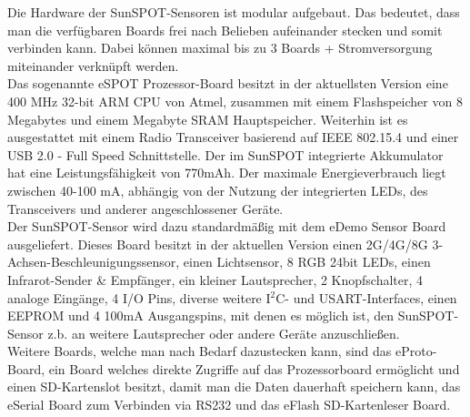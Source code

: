 Die Hardware der SunSPOT-Sensoren ist modular aufgebaut. Das bedeutet, dass man die verfügbaren Boards frei nach Belieben aufeinander stecken und somit verbinden kann. Dabei können maximal bis zu 3 Boards + Stromversorgung miteinander verknüpft werden. \cite{d:horan} \\

Das sogenannte eSPOT Prozessor-Board besitzt in der aktuellsten Version eine 400 MHz 32-bit ARM CPU von Atmel, zusammen mit einem Flashspeicher von 8 Megabytes und einem Megabyte SRAM Hauptspeicher. Weiterhin ist es ausgestattet mit einem Radio Transceiver basierend auf IEEE 802.15.4 und einer USB 2.0 - Full Speed Schnittstelle. Der im SunSPOT integrierte Akkumulator hat eine Leistungsfähigkeit von 770mAh. Der maximale Energieverbrauch liegt zwischen 40-100 mA, abhängig von der Nutzung der integrierten LEDs, des Transceivers und anderer angeschlossener Geräte. \cite{d:horan} \cite{d:spotmain} \\

Der SunSPOT-Sensor wird dazu standardmäßig mit dem eDemo Sensor Board ausgeliefert. Dieses Board besitzt in der aktuellen Version einen 2G/4G/8G 3-Achsen-Beschleunigungssensor, einen Lichtsensor, 8 RGB 24bit LEDs, einen Infrarot-Sender \& Empfänger, ein kleiner Lautsprecher, 2 Knopfschalter, 4 analoge Eingänge, 4 I/O Pins, diverse weitere I$^2$C- und USART-Interfaces, einen EEPROM und 4 100mA Ausgangspins, mit denen es möglich ist, den SunSPOT-Sensor z.b. an weitere Lautsprecher oder andere Geräte anzuschließen. \cite{d:horan} \cite{d:spotdemo} \\

Weitere Boards, welche man nach Bedarf dazustecken kann, sind das eProto-Board, ein Board welches direkte Zugriffe auf das Prozessorboard ermöglicht und einen SD-Kartenslot besitzt, damit man die Daten dauerhaft speichern kann, das eSerial Board zum Verbinden via RS232 und das eFlash SD-Kartenleser Board. \cite{d:horan} \\

